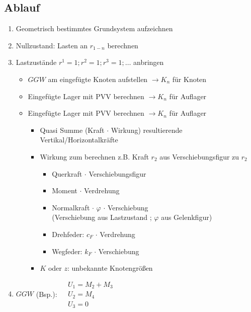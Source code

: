 \documentclass[fleqn,twoside]{article}
\begin{document}
    \subsection{Ablauf}
        \begin{enumerate}
            \item Geometrisch bestimmtes Grundsystem aufzeichnen
            \item Nullzustand: Lasten an $r_{1-n}$ berechnen
            \item Lastzustände $r^1=1 ; r^2=1 ; r^3=1 ; \ldots$ anbringen
                \begin{itemize}
                    \item $GGW$ am eingefügte Knoten aufstellen $\rightarrow K_n$ für Knoten
                    \item Eingefügte Lager mit PVV berechnen $\rightarrow K_n$ für Auflager
                    \item Eingefügte Lager mit PVV berechnen $\rightarrow K_n$ für Auflager
                        \begin{itemize}
                            \item Quasi Summe (Kraft $\cdot$ Wirkung) resultierende Vertikal/Horizontalkräfte
                            \item Wirkung zum berechnen z.B. Kraft $r_2$ aus Verschiebungsfigur zu $r_2$
                                \begin{itemize}
                                    \item Querkraft $\cdot$ Verschiebungsfigur
                                    \item Moment $\cdot$ Verdrehung
                                    \item Normalkraft $\cdot$ $\varphi$ $\cdot$ Verschiebung\\
                                        (Verschiebung aus Lastzustand ; $\varphi$ aus Gelenkfigur)
                                    \item Drehfeder: $c_F$ $\cdot$ Verdrehung
                                    \item Wegfeder: $k_F$ $\cdot$ Verschiebung
                                \end{itemize}
                            \item $K$ oder $z$: unbekannte Knotengrößen
                        \end{itemize}
                \end{itemize}
            \item $GGW$ (Bsp.): $\begin{aligned} & U_1=M_2+M_3 \\ & U_2=M_4 \\ & U_3=0\end{aligned}$

\end{enumerate}
\end{document}
